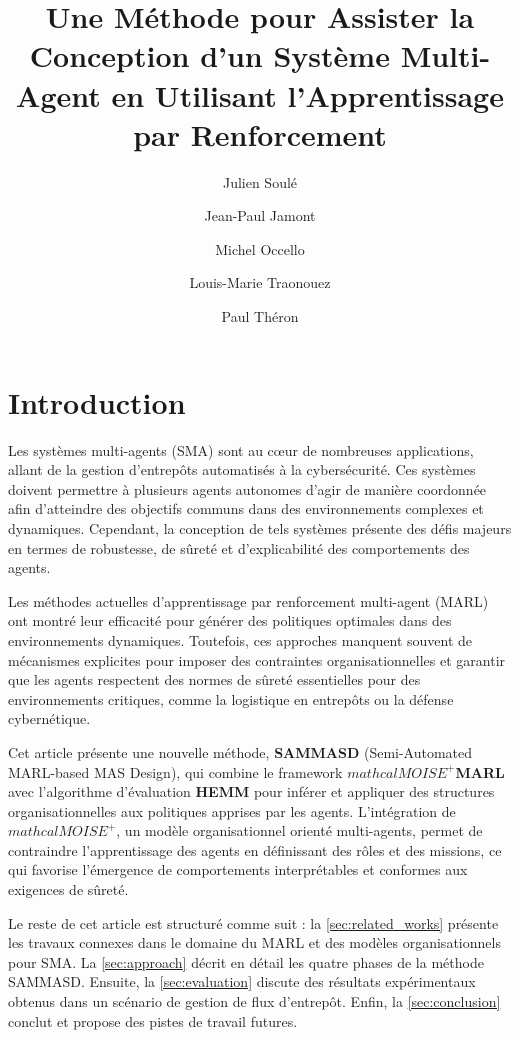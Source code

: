 \documentclass[sigconf,anonymous]{aamas}
\title[AAMAS-2025 CybMASDE]{Une Méthode pour Assister la Conception d'un Système Multi-Agent en Utilisant l'Apprentissage par Renforcement}
\author{Julien Soulé}
\affiliation{
  \institution{Univ. Grenoble Alpes}
  \city{Valence}
  \country{France}}
\author{Jean-Paul Jamont}
\affiliation{
  \institution{Univ. Grenoble Alpes}
  \city{Valence}
  \country{France}}
\author{Michel Occello}
\affiliation{
  \institution{Univ. Grenoble Alpes}
  \city{Valence}
  \country{France}}
\author{Louis-Marie Traonouez}
\affiliation{
  \institution{Thales Land and Air Systems, BU IAS}
  \city{Rennes}
  \country{France}}
\author{Paul Théron}
\affiliation{
  \institution{AICA IWG}
  \city{La Guillermie}
  \country{France}}
\begin{document}

\pagestyle{fancy}
\fancyhead{}


\maketitle


\section{Introduction}

Les systèmes multi-agents (SMA) sont au cœur de nombreuses applications, allant de la gestion d'entrepôts automatisés à la cybersécurité. Ces systèmes doivent permettre à plusieurs agents autonomes d'agir de manière coordonnée afin d'atteindre des objectifs communs dans des environnements complexes et dynamiques. Cependant, la conception de tels systèmes présente des défis majeurs en termes de robustesse, de sûreté et d'explicabilité des comportements des agents.

Les méthodes actuelles d'apprentissage par renforcement multi-agent (MARL) ont montré leur efficacité pour générer des politiques optimales dans des environnements dynamiques. Toutefois, ces approches manquent souvent de mécanismes explicites pour imposer des contraintes organisationnelles et garantir que les agents respectent des normes de sûreté essentielles pour des environnements critiques, comme la logistique en entrepôts ou la défense cybernétique.

Cet article présente une nouvelle méthode, \textbf{SAMMASD} (Semi-Automated MARL-based MAS Design), qui combine le framework \textbf{$mathcal{M}OISE^+$MARL} avec l'algorithme d'évaluation \textbf{HEMM} pour inférer et appliquer des structures organisationnelles aux politiques apprises par les agents. L'intégration de \textbf{$mathcal{M}OISE^+$}, un modèle organisationnel orienté multi-agents, permet de contraindre l'apprentissage des agents en définissant des rôles et des missions, ce qui favorise l'émergence de comportements interprétables et conformes aux exigences de sûreté.

Le reste de cet article est structuré comme suit : la \autoref{sec:related_works} présente les travaux connexes dans le domaine du MARL et des modèles organisationnels pour SMA. La \autoref{sec:approach} décrit en détail les quatre phases de la méthode SAMMASD. Ensuite, la \autoref{sec:evaluation} discute des résultats expérimentaux obtenus dans un scénario de gestion de flux d'entrepôt. Enfin, la \autoref{sec:conclusion} conclut et propose des pistes de travail futures.
\end{document}

